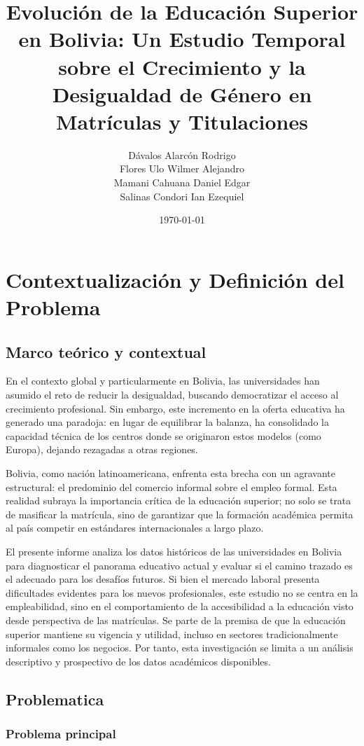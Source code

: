 \documentclass[10pt, twocolumn]{article}
\title{Evolución de la Educación Superior en Bolivia: Un Estudio Temporal sobre el Crecimiento y la Desigualdad de Género en Matrículas y Titulaciones}
\author{Dávalos Alarcón Rodrigo \\
        Flores Ulo Wilmer Alejandro \\
        Mamani Cahuana Daniel Edgar \\
        Salinas Condori Ian Ezequiel \\
       }
\date{\today}
\begin{document}
\maketitle

\section{Contextualización y Definición del Problema}

\subsection{Marco teórico y contextual}

En el contexto global y particularmente en Bolivia, las universidades han asumido el reto de reducir la desigualdad, buscando democratizar el acceso al crecimiento profesional. Sin embargo, este incremento en la oferta educativa ha generado una paradoja: en lugar de equilibrar la balanza, ha consolidado la capacidad técnica de los centros donde se originaron estos modelos (como Europa), dejando rezagadas a otras regiones.

Bolivia, como nación latinoamericana, enfrenta esta brecha con un agravante estructural: el predominio del comercio informal sobre el empleo formal. Esta realidad subraya la importancia crítica de la educación superior; no solo se trata de masificar la matrícula, sino de garantizar que la formación académica permita al país competir en estándares internacionales a largo plazo.

El presente informe analiza los datos históricos de las universidades en Bolivia para diagnosticar el panorama educativo actual y evaluar si el camino trazado es el adecuado para los desafíos futuros. Si bien el mercado laboral presenta dificultades evidentes para los nuevos profesionales, este estudio no se centra en la empleabilidad, sino en el comportamiento de la accesibilidad a la educación visto desde perspectiva de las matrículas. Se parte de la premisa de que la educación superior mantiene su vigencia y utilidad, incluso en sectores tradicionalmente informales como los negocios. Por tanto, esta investigación se limita a un análisis descriptivo y prospectivo de los datos académicos disponibles.

\subsection{Problematica}

\subsubsection{Problema principal}
\end{document}
